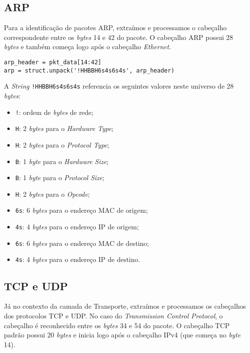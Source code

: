 \documentclass[12pt]{article}
\begin{document}
\subsection{ARP}
Para a identificação de pacotes ARP, extraímos e processamos o cabeçalho correspondente entre os \emph{bytes} 14 e 42 do pacote. O cabeçalho ARP possui 28 \emph{bytes} e também começa logo após o cabeçalho \emph{Ethernet}.

\begin{lstlisting}[style=vscode]
arp_header = pkt_data[14:42]
arp = struct.unpack('!HHBBH6s4s6s4s', arp_header)
\end{lstlisting}

\quad A \emph{String} \texttt{!HHBBH6s4s6s4s} referencia os seguintes valores neste universo de 28 \emph{bytes}:

\begin{itemize}
    \item \texttt{!}: ordem de \emph{bytes} de rede;
    \item \texttt{H}: 2 \emph{bytes} para o \emph{Hardware Type};
    \item \texttt{H}: 2 \emph{bytes} para o \emph{Protocol Type};
    \item \texttt{B}: 1 \emph{byte} para o \emph{Hardware Size};
    \item \texttt{B}: 1 \emph{byte} para o \emph{Protocol Size};
    \item \texttt{H}: 2 \emph{bytes} para o \emph{Opcode};
    \item \texttt{6s}: 6 \emph{bytes} para o endereço MAC de origem;
    \item \texttt{4s}: 4 \emph{bytes} para o endereço IP de origem;
    \item \texttt{6s}: 6 \emph{bytes} para o endereço MAC de destino;
    \item \texttt{4s}: 4 \emph{bytes} para o endereço IP de destino.
\end{itemize}

\subsection{TCP e UDP}
Já no contexto da camada de Transporte, extraímos e processamos os cabeçalhos dos protocolos TCP e UDP. No caso do \emph{Transmission Control Protocol}, o cabeçalho é reconhecido entre os \emph{bytes} 34 e 54 do pacote. O cabeçalho TCP padrão possui 20 \emph{bytes} e inicia logo após o cabeçalho IPv4 (que começa no \emph{byte} 14).
\end{document}
